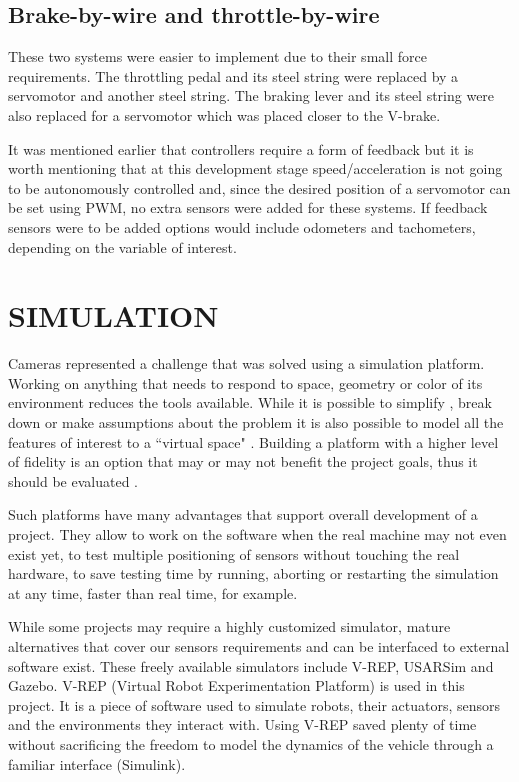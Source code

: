\documentclass[twocolumn,10pt]{asme2e}
\begin{document}
\subsection*{Brake-by-wire and throttle-by-wire}
These two systems were easier to implement due to their small force
requirements. The throttling pedal and its steel string were replaced
by a servomotor and another steel string. The braking lever and its
steel string were also replaced for a servomotor which was placed closer
to the V-brake. 

It was mentioned earlier that controllers require a form of feedback
but it is worth mentioning that at this development stage speed/acceleration
is not going to be autonomously controlled and, since the desired position
of a servomotor can be set using PWM, no extra sensors were added for
these systems. If feedback sensors were to be added options would include
odometers and tachometers, depending on the variable of interest.

\section*{SIMULATION}

Cameras represented a challenge that was solved using a simulation platform.
Working on anything that needs to respond to space, geometry or 
color of its environment reduces the tools available. While it is possible
to simplify \cite{farooq}, break down or make assumptions about the problem
it is also possible to model all the features of interest to a ``virtual space"
\cite{Ryoichi}. Building a platform with a higher level of fidelity is an option that may or may not benefit
the project goals, thus it should be evaluated \cite{jayakumar}. 

Such platforms have many advantages that support overall development of a project.
They allow to work on the software when the real machine may not even exist
yet, to test multiple positioning of sensors without touching the real hardware,
to save testing time by running, aborting or restarting the simulation at any time,
faster than real time, for example.

While some projects may require a highly customized simulator, mature alternatives
that cover our sensors requirements and can be interfaced to external software exist.
These freely available simulators include V-REP, USARSim and Gazebo.
V-REP (Virtual Robot Experimentation Platform) is used in this project. It is
a piece of software used to simulate robots, their actuators, sensors and
the environments they interact with. Using V-REP saved plenty of time without sacrificing
the freedom to model the dynamics of the vehicle through a familiar interface (Simulink).
\end{document}
